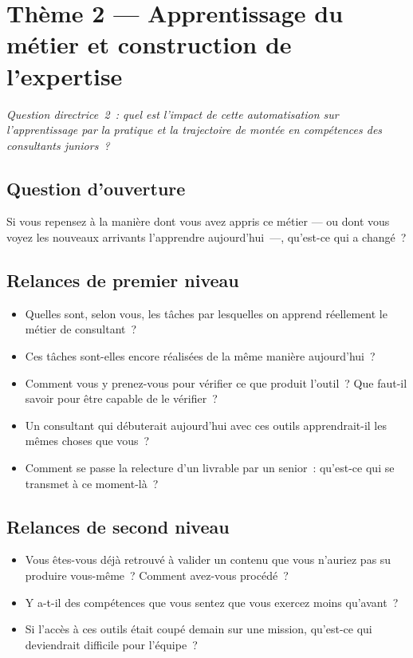 \section{Thème 2 --- Apprentissage du métier et construction de l'expertise}

\textit{Question directrice~2~: quel est l'impact de cette automatisation sur
l'apprentissage par la pratique et la trajectoire de montée en compétences des
consultants juniors~?}

\subsection*{Question d'ouverture}

Si vous repensez à la manière dont vous avez appris ce métier --- ou dont vous voyez
les nouveaux arrivants l'apprendre aujourd'hui~---, qu'est-ce qui a changé~?

\subsection*{Relances de premier niveau}

\begin{itemize}
    \item Quelles sont, selon vous, les tâches par lesquelles on apprend réellement le
    métier de consultant~?
    \item Ces tâches sont-elles encore réalisées de la même manière aujourd'hui~?
    \item Comment vous y prenez-vous pour vérifier ce que produit l'outil~? Que faut-il
    savoir pour être capable de le vérifier~?
    \item Un consultant qui débuterait aujourd'hui avec ces outils apprendrait-il les
    mêmes choses que vous~?
    \item Comment se passe la relecture d'un livrable par un senior~: qu'est-ce qui se
    transmet à ce moment-là~?
\end{itemize}

\subsection*{Relances de second niveau}

\begin{itemize}
    \item Vous êtes-vous déjà retrouvé à valider un contenu que vous n'auriez pas su
    produire vous-même~? Comment avez-vous procédé~?
    \item Y a-t-il des compétences que vous sentez que vous exercez moins qu'avant~?
    \item Si l'accès à ces outils était coupé demain sur une mission, qu'est-ce qui
    deviendrait difficile pour l'équipe~?
\end{itemize}

